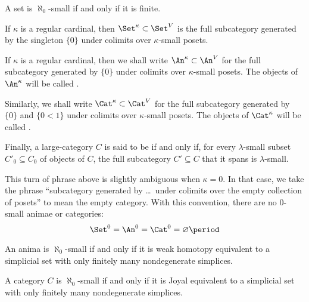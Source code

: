 \begin{eg}
	A set is $ \aleph_0 $-small if and only if it is finite.
\end{eg}

\begin{nul}
	If $ \kappa $ is a regular cardinal,
	then $ \Set^{\kappa} \subset \Set^V $ is the full subcategory
	generated by the singleton $ \{ 0 \}$
	under colimits over $ \kappa $-small posets.
\end{nul}

\begin{definition}
	If $ \kappa $ is a regular cardinal,
	then we shall write $ \An^{\kappa} \subset \An^V $
	for the full subcategory generated by $ \{ 0 \} $
	under colimits over $ \kappa $-small posets.
	The objects of $ \An^{\kappa} $ will be called
	.

	Similarly, we shall write $ \Cat^{\kappa} \subset \Cat^V $
	for the full subcategory generated 
	by $ \{ 0 \} $ and $ \{ 0 < 1 \} $
	under colimits over $ \kappa $-small posets.
	The objects of $ \Cat^{\kappa} $ will be called
	.

	Finally, a large-category $ C $
	is said to be 
	if and only if,
	for every $ \lambda $-small subset $ C'_0 \subseteq C_0 $
	of objects of $ C $, the full subcategory $ C' \subseteq C $
	that it spans is $ \lambda $-small.
\end{definition}

\begin{eg}
	This turn of phrase above is slightly ambiguous when $ \kappa = 0 $.
	In that case, we take the phrase
	\enquote{subcategory generated by \ldots\ under colimits
	over the empty collection of posets}
	to mean the empty category.
	With this convention, there are no $ 0 $-small animae or categories:
	\[ \Set^0 = \An^0 = \Cat^0 = \varnothing \period \]
\end{eg}

\begin{eg}
	An anima is $ \aleph_0 $-small if and only if
	it is weak homotopy equivalent to a simplicial set
	with only finitely many nondegenerate simplices.

	A category $ C $ is $ \aleph_0 $-small if and only if
	it is Joyal equivalent to a simplicial set
	with only finitely many nondegenerate simplices. 
\end{eg}

